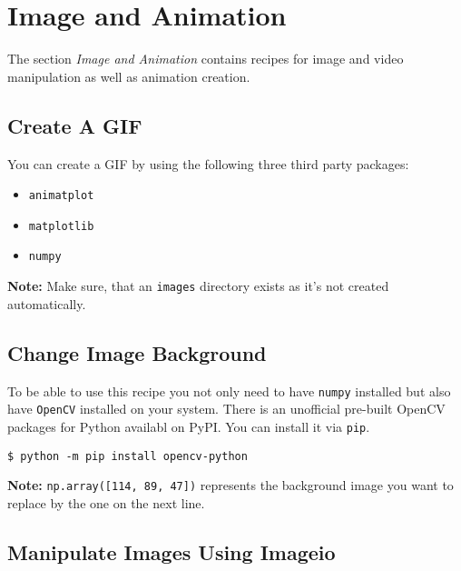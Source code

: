 
\section{Image and Animation}

The section \textit{Image and Animation} contains recipes for image and video manipulation as well as animation creation.

\subsection{Create A GIF}

You can create a GIF by using the following three third party packages:

\begin{itemize}
    \item \lstinline{animatplot}
    \item \lstinline{matplotlib}
    \item \lstinline{numpy}
\end{itemize}



\textbf{Note:} Make sure, that an \lstinline{images} directory exists as it's not created automatically.


\subsection{Change Image Background}

To be able to use this recipe you not only need to have \lstinline{numpy} installed but also have \lstinline{OpenCV} installed on your system.
There is an unofficial pre-built OpenCV packages for Python availabl on PyPI.
You can install it via \lstinline{pip}.

\begin{lstlisting}[caption=Install the unofficial pre-build OpenCV Python package from PyPI]
$ python -m pip install opencv-python
\end{lstlisting}



\textbf{Note:} \lstinline{np.array([114, 89, 47])} represents the background image you want to replace by the one on the next line.


\subsection{Manipulate Images Using Imageio}

